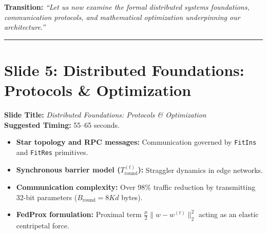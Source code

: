 \documentclass[11pt,a4paper]{article}
\begin{document}
\textbf{Transition:} \textit{``Let us now examine the formal distributed systems foundations, communication protocols, and mathematical optimization underpinning our architecture.''}

\vspace{0.35cm}\hrule\vspace{0.35cm}

\section{Slide 5: Distributed Foundations: Protocols \& Optimization}
\textbf{Slide Title:} \textit{Distributed Foundations: Protocols \& Optimization} \\
\textbf{Suggested Timing:} 55--65 seconds.

\begin{tcolorbox}[colframe=primaryblue, title=\textbf{Key Distributed Systems Points to Emphasize}]
\begin{itemize}[leftmargin=*]
    \item \textbf{Star topology and RPC messages:} Communication governed by \texttt{FitIns} and \texttt{FitRes} primitives.
    \item \textbf{Synchronous barrier model ($T_{\text{round}}^{(t)}$):} Straggler dynamics in edge networks.
    \item \textbf{Communication complexity:} Over 98\% traffic reduction by transmitting 32-bit parameters ($B_{\text{round}} = 8Kd$ bytes).
    \item \textbf{FedProx formulation:} Proximal term $\frac{\mu}{2}\|w - w^{(t)}\|_2^2$ acting as an elastic centripetal force.
\end{itemize}
\end{tcolorbox}
\end{document}
